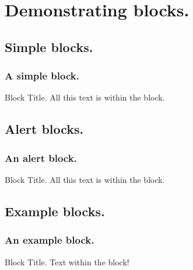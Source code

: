 \documentclass[9pt,aspectratio=169]{beamer}
\begin{document}
\section{Demonstrating blocks.}
\subsection{Simple blocks.}
\begin{frame}
    \frametitle{A simple block.}
    \begin{block}{Block Title.}
        All this text is within the block.
    \end{block}
\end{frame}

\subsection{Alert blocks.}
\begin{frame}
    \frametitle{An alert block.}
    \begin{alertblock}{Block Title.}
        All this text is within the block.
    \end{alertblock}
\end{frame}

\subsection{Example blocks.}
\begin{frame}
    \frametitle{An example block.}
    \begin{exampleblock}{Block Title.}
        Text within the block!
    \end{exampleblock}
\end{frame}

\end{document}
